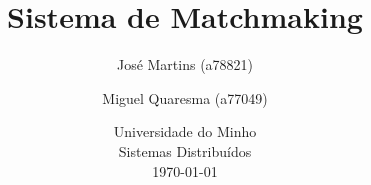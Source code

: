 \documentclass{article}
\begin{document}
\title{\vspace*{\fill}Sistema de Matchmaking}
\author{José Martins (a78821) \and Miguel Quaresma (a77049)}
\date{%
    Universidade do Minho\\
    Sistemas Distribuídos\\[2ex]%
    \today\vspace*{\fill}
}
\maketitle

\newpage
\end{document}
